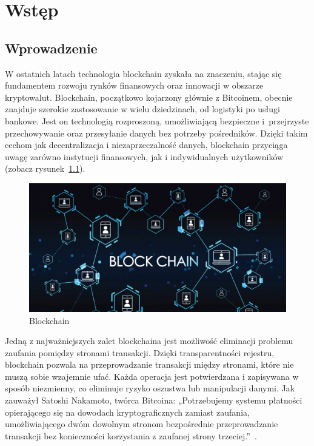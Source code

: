 \chapter{Wstęp}

\section{Wprowadzenie}

W ostatnich latach technologia blockchain zyskała na znaczeniu, stając się fundamentem rozwoju rynków finansowych oraz innowacji w obszarze kryptowalut. Blockchain, początkowo kojarzony głównie z Bitcoinem, obecnie znajduje szerokie zastosowanie w wielu dziedzinach, od logistyki po usługi bankowe. Jest on technologią rozproszoną, umożliwiającą bezpieczne i~przejrzyste przechowywanie oraz przesyłanie danych bez potrzeby pośredników. Dzięki takim cechom jak decentralizacja i niezaprzeczalność danych, blockchain przyciąga uwagę zarówno instytucji finansowych, jak i indywidualnych użytkowników (zobacz rysunek~\ref{fig:Blockchain}).
\begin{figure}[htb]
    \centering
    \includegraphics[width=0.8\linewidth]{./obrazy/blockchain}
    \caption{Blockchain}
    \label{fig:Blockchain}
\end{figure}

Jedną z najważniejszych zalet blockchaina jest możliwość eliminacji problemu zaufania pomiędzy stronami transakcji. Dzięki transparentności rejestru, blockchain pozwala na przeprowadzanie transakcji między stronami, które nie muszą sobie wzajemnie ufać. Każda operacja jest potwierdzana i zapisywana w sposób niezmienny, co eliminuje ryzyko oszustwa lub manipulacji danymi. Jak zauważył Satoshi Nakamoto, twórca Bitcoina: „Potrzebujemy systemu płatności opierającego się na dowodach kryptograficznych zamiast zaufania, umożliwiającego dwóm dowolnym stronom bezpośrednie przeprowadzanie transakcji bez konieczności korzystania z zaufanej strony trzeciej.”~\cite{nakamoto_2008}.

